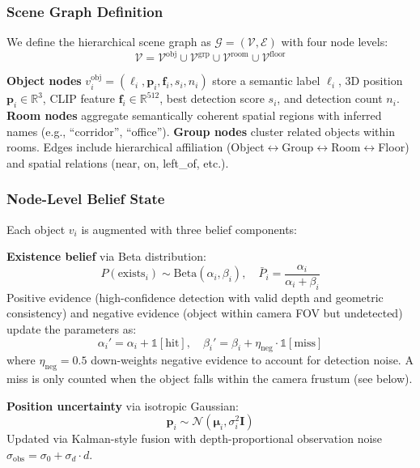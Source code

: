 \documentclass[conference]{IEEEtran}
\newcommand{\vp}{\mathbf{p}}
\newcommand{\vf}{\mathbf{f}}
\newcommand{\vmu}{\boldsymbol{\mu}}
\begin{document}
\subsubsection{Scene Graph Definition}

We define the hierarchical scene graph as $\mathcal{G} = (\mathcal{V}, \mathcal{E})$ with four node levels:
\begin{equation}
\mathcal{V} = \mathcal{V}^{\text{obj}} \cup \mathcal{V}^{\text{grp}} \cup \mathcal{V}^{\text{room}} \cup \mathcal{V}^{\text{floor}}
\end{equation}

\noindent\textbf{Object nodes} $v_i^{\text{obj}} = (\ell_i, \vp_i, \vf_i, s_i, n_i)$ store a semantic label $\ell_i$, 3D position $\vp_i \in \mathbb{R}^3$, CLIP feature $\vf_i \in \mathbb{R}^{512}$, best detection score $s_i$, and detection count $n_i$.
\textbf{Room nodes} aggregate semantically coherent spatial regions with inferred names (e.g., ``corridor'', ``office'').
\textbf{Group nodes} cluster related objects within rooms.
Edges include hierarchical affiliation (Object$\leftrightarrow$Group$\leftrightarrow$Room$\leftrightarrow$Floor) and spatial relations (near, on, left\_of, etc.).

\subsubsection{Node-Level Belief State}

Each object $v_i$ is augmented with three belief components:

\textbf{Existence belief} via Beta distribution:
\begin{equation}
P(\text{exists}_i) \sim \text{Beta}(\alpha_i, \beta_i), \quad \bar{P}_i = \frac{\alpha_i}{\alpha_i + \beta_i}
\label{eq:existence}
\end{equation}
Positive evidence (high-confidence detection with valid depth and geometric consistency) and negative evidence (object within camera FOV but undetected) update the parameters as:
\begin{equation}
\alpha_i' = \alpha_i + \mathbb{1}[\text{hit}], \quad
\beta_i' = \beta_i + \eta_{\text{neg}} \cdot \mathbb{1}[\text{miss}]
\label{eq:belief_update}
\end{equation}
where $\eta_{\text{neg}} = 0.5$ down-weights negative evidence to account for detection noise.
A miss is only counted when the object falls within the camera frustum (see below).

\textbf{Position uncertainty} via isotropic Gaussian:
\begin{equation}
\vp_i \sim \mathcal{N}(\vmu_i, \sigma_i^2 \mathbf{I})
\end{equation}
Updated via Kalman-style fusion with depth-proportional observation noise $\sigma_{\text{obs}} = \sigma_0 + \sigma_d \cdot d$.
\end{document}

